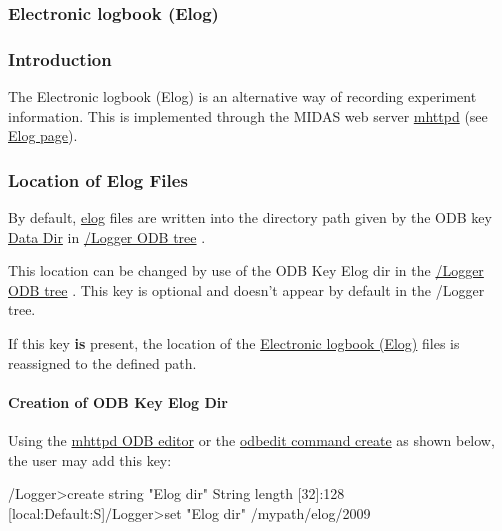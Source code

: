 \par
 

\label{index_end}
\hypertarget{index_end}{}
 \subsubsection{Electronic logbook (Elog)}\label{F_Elog}
\par
 

\par
 \label{F_Elog_idx_Elog_Introduction}
\hypertarget{F_Elog_idx_Elog_Introduction}{}
 \label{F_Elog_idx_Logging_Elog}
\hypertarget{F_Elog_idx_Logging_Elog}{}
 \hypertarget{F_Elog_F_Elog_Intro}{}\subsubsection{Introduction}\label{F_Elog_F_Elog_Intro}
The Electronic logbook (Elog) is an alternative way of recording experiment information. This is implemented through the MIDAS web server \hyperlink{RC_mhttpd_utility}{mhttpd} (see \hyperlink{RC_mhttpd_Elog_page}{Elog page}).\hypertarget{F_Elog_F_Logger_Elog_Files_Location}{}\subsubsection{Location of Elog Files}\label{F_Elog_F_Logger_Elog_Files_Location}
\label{F_Elog_F_Logger_Elog_Dir}
\hypertarget{F_Elog_F_Logger_Elog_Dir}{}
 \label{F_Elog_idx_Elog_Files_location}
\hypertarget{F_Elog_idx_Elog_Files_location}{}
 By default, \hyperlink{F_Elog}{elog} files are written into the directory path given by the ODB key \hyperlink{F_Logging_Data_F_Logger_Data_Dir}{Data Dir} in \hyperlink{F_Logging_Data_F_Logger_tree}{/Logger ODB tree} .

This location can be changed by use of the ODB Key Elog dir in the \hyperlink{F_Logging_Data_F_Logger_tree}{/Logger ODB tree} . This key is optional and doesn't appear by default in the /Logger tree. \par
 If this key {\bfseries is} present, the location of the \hyperlink{F_Elog}{Electronic logbook (Elog)} files is reassigned to the defined path.\hypertarget{F_Elog_F_Logger_Create_Elog_Dir}{}\paragraph{Creation of ODB Key Elog Dir}\label{F_Elog_F_Logger_Create_Elog_Dir}
Using the \hyperlink{RC_mhttpd_ODB_page}{mhttpd ODB editor} or the \hyperlink{RC_odbedit_examples_RC_odbedit_cr}{odbedit command create} as shown below, the user may add this key: 
\begin{DoxyCode}
/Logger>create string "Elog dir"
String length [32]:128
[local:Default:S]/Logger>set "Elog dir" /mypath/elog/2009
\end{DoxyCode}


